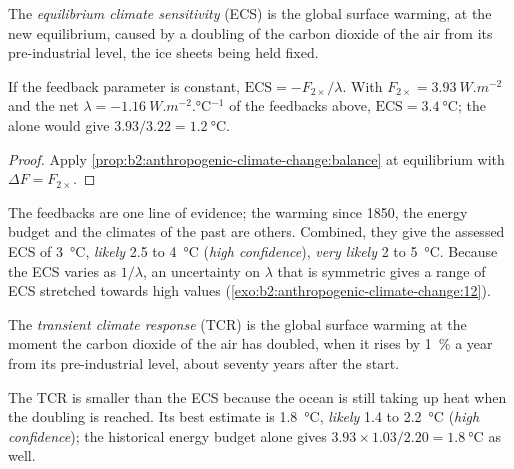 \begin{definition}\label{def:b2:anthropogenic-climate-change:ecs}
The \emph{equilibrium climate sensitivity} (ECS) is the
global surface warming, at the new equilibrium, caused by a doubling of the carbon dioxide of the
air from its pre-industrial level, the ice sheets being held fixed.
\end{definition}

\begin{proposition}\label{prop:b2:anthropogenic-climate-change:ecs}
If the feedback parameter is constant, $\text{ECS} = -F_{2\times}/\lambda$. With $F_{2\times} =
\qty{3.93}{W.m^{-2}}$ and the net $\lambda = \qty{-1.16}{W.m^{-2}.\celsius^{-1}}$ of the feedbacks
above, $\text{ECS} = \qty{3.4}{\celsius}$; the  alone would give $3.93/3.22 =
\qty{1.2}{\celsius}$.
\end{proposition}
\begin{proof}
Apply \cref{prop:b2:anthropogenic-climate-change:balance} at equilibrium with $\Delta F =
F_{2\times}$.
\end{proof}

The feedbacks are one line of evidence; the warming since 1850, the energy budget and the climates
of the past are others. Combined, they give the assessed ECS of \qty{3}{\celsius}, \emph{likely}
2.5 to \qty{4}{\celsius} (\emph{high confidence}), \emph{very likely} 2 to \qty{5}{\celsius}.
Because the ECS varies as $1/\lambda$, an uncertainty on $\lambda$ that is symmetric gives a range
of ECS stretched towards high values (\cref{exo:b2:anthropogenic-climate-change:12}).

\begin{definition}\label{def:b2:anthropogenic-climate-change:tcr}
The \emph{transient climate response} (TCR) is the global surface
warming at the moment the carbon dioxide of the air has doubled, when it rises by \qty{1}{\percent}
a year from its pre-industrial level, about seventy years after the start.
\end{definition}

The TCR is smaller than the ECS because the ocean is still taking up heat when the doubling is
reached. Its best estimate is \qty{1.8}{\celsius}, \emph{likely} 1.4 to \qty{2.2}{\celsius}
(\emph{high confidence}); the historical energy budget alone gives $3.93 \times 1.03/2.20 =
\qty{1.8}{\celsius}$ as well.


